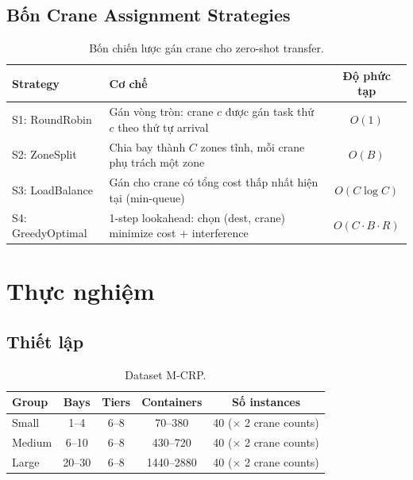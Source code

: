 \documentclass[11pt,a4paper]{article}
\theoremstyle{definition}
\newcommand{\1}{\mathbbm{1}}
\begin{document}
\subsection{Bốn Crane Assignment Strategies}

\begin{table}[h!]
    \centering
    \caption{Bốn chiến lược gán crane cho zero-shot transfer.}
    \label{tab:strategies}
    \begin{tabularx}{\textwidth}{lXc}
        \toprule
        Strategy & Cơ chế & Độ phức tạp \\
        \midrule
        S1: RoundRobin & Gán vòng tròn: crane $c$ được gán task thứ $c$ theo thứ tự arrival & $O(1)$ \\
        S2: ZoneSplit & Chia bay thành $C$ zones tĩnh, mỗi crane phụ trách một zone & $O(B)$ \\
        S3: LoadBalance & Gán cho crane có tổng cost thấp nhất hiện tại (min-queue) & $O(C \log C)$ \\
        S4: GreedyOptimal & 1-step lookahead: chọn (dest, crane) minimize cost + interference & $O(C \cdot B \cdot R)$ \\
        \bottomrule
    \end{tabularx}
\end{table}

\section{Thực nghiệm}

\subsection{Thiết lập}

\begin{table}[h!]
    \centering
    \caption{Dataset M-CRP.}
    \label{tab:dataset}
    \begin{tabularx}{\textwidth}{lcccc}
        \toprule
        Group & Bays & Tiers & Containers & Số instances \\
        \midrule
        Small & 1--4 & 6--8 & 70--380 & 40 ($\times$ 2 crane counts) \\
        Medium & 6--10 & 6--8 & 430--720 & 40 ($\times$ 2 crane counts) \\
        Large & 20--30 & 6--8 & 1440--2880 & 40 ($\times$ 2 crane counts) \\
        \bottomrule
    \end{tabularx}
\end{table}
\end{document}
